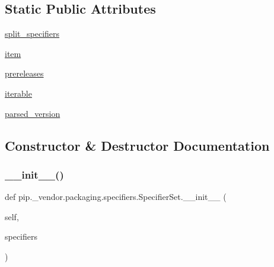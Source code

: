 \subsection*{Static Public Attributes}
\begin{DoxyCompactItemize}
\item 
\hyperlink{classpip_1_1__vendor_1_1packaging_1_1specifiers_1_1SpecifierSet_a2d40c6012d03bb082bbd1c9505355ace}{split\+\_\+specifiers}
\item 
\hyperlink{classpip_1_1__vendor_1_1packaging_1_1specifiers_1_1SpecifierSet_aa12be50b2f6d2336f89a1d0f184fdb52}{item}
\item 
\hyperlink{classpip_1_1__vendor_1_1packaging_1_1specifiers_1_1SpecifierSet_a006ff283e1344358ad8e5e2106cfea0e}{prereleases}
\item 
\hyperlink{classpip_1_1__vendor_1_1packaging_1_1specifiers_1_1SpecifierSet_ab2a82e787284194eef9df8a454507b9b}{iterable}
\item 
\hyperlink{classpip_1_1__vendor_1_1packaging_1_1specifiers_1_1SpecifierSet_afd36aa62ee243ba298bfbfd440cec983}{parsed\+\_\+version}
\end{DoxyCompactItemize}


\subsection{Constructor \& Destructor Documentation}
\mbox{\label{classpip_1_1__vendor_1_1packaging_1_1specifiers_1_1SpecifierSet_afcc0d1fb0ce0b11c7d3498b9dc496acc}} 
\subsubsection{\texorpdfstring{\+\_\+\+\_\+init\+\_\+\+\_\+()}{\_\_init\_\_()}}
{\footnotesize\ttfamily def pip.\+\_\+vendor.\+packaging.\+specifiers.\+Specifier\+Set.\+\_\+\+\_\+init\+\_\+\+\_\+ (\begin{DoxyParamCaption}\item[{}]{self,  }\item[{}]{specifiers }\end{DoxyParamCaption})}




